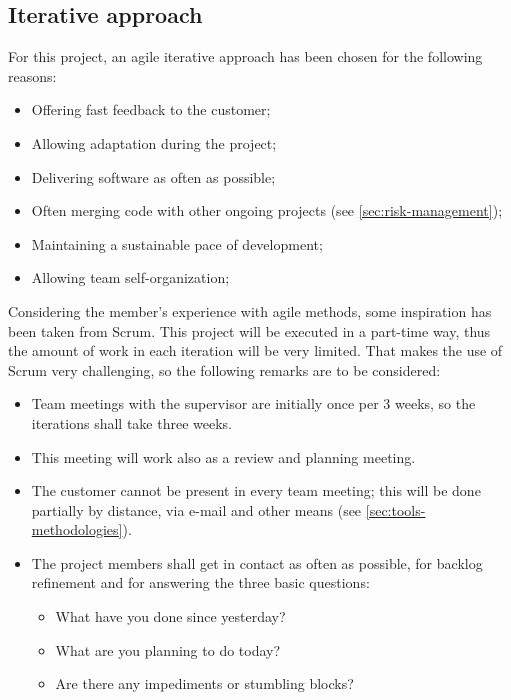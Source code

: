 \subsection{Iterative approach}
%
%
For this project, an agile iterative approach has been chosen for the following reasons:
\begin{itemize}
	\item Offering fast feedback to the customer;
	\item Allowing adaptation during the project;
	\item Delivering software as often as possible;
	\item Often merging code with other ongoing projects (see \autoref{sec:risk-management});
	\item Maintaining a sustainable pace of development;
	\item Allowing team self-organization;
\end{itemize}
%
Considering the member's experience with agile methods, some inspiration has been taken from Scrum.
This project will be executed in a part-time way, thus the amount of work in each iteration will be very limited.
That makes the use of Scrum very challenging, so the following remarks are to be considered:
\begin{itemize}
	\item Team meetings with the supervisor are initially once per 3 weeks, so the iterations shall take three weeks.
	\item This meeting will work also as a review and planning meeting.
	\item The customer cannot be present in every team meeting; this will be done partially by distance, via e-mail and other means (see \autoref{sec:tools-methodologies}).
	\item The project members shall get in contact as often as possible, for backlog refinement and for answering the three basic questions:
		\begin{itemize}
			\item What have you done since yesterday?
			\item What are you planning to do today?
			\item Are there any impediments or stumbling blocks?
		\end{itemize}
\end{itemize}

